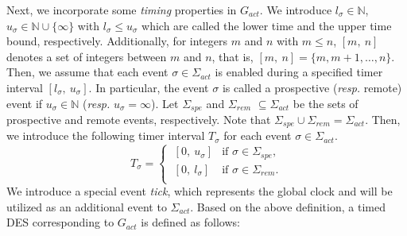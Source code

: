 \documentclass[journal,twoside,web]{IEEEtran}
\begin{document}
Next, we incorporate some \textit{timing} properties in $G_{act}$. 
We introduce $l_{\sigma} \in \mathbb{N}$, $u_{\sigma} \in  \mathbb{N} \cup \{\infty\}$ with  $l_{\sigma} \leq u_{\sigma}$ which are called the lower time and the upper time bound, respectively.
Additionally, for integers $m$ and $n$ with $m \leq n$, $[m,\ n]$ denotes a set of integers between $m$ and $n$, that is, $[m,\ n]=\{ m, m+1, \ldots , n\}$.
Then, we assume that each event $\sigma \in \Sigma_{act}$ is enabled during a specified timer interval $[ l_{\sigma},\ u_{\sigma}]$.
%
In particular, the event $\sigma$ is called a prospective ({\sl resp.} remote) event if $u_{\sigma} \in \mathbb{N}$ ({\sl resp.} $u_{\sigma} = \infty$). 
Let $\Sigma_{spe}$ and $\Sigma_{rem}$ $\subseteq \Sigma_{act}$ be the sets of prospective and remote events, respectively.  Note that $\Sigma_{spe} \cup \Sigma_{rem} = \Sigma_{act}$.
Then, we introduce the following timer interval $T_{\sigma}$ for each event $\sigma \in \Sigma_{act}$.
\begin{equation}
\label{T_sigma}
T_{\sigma}= \left\{
\begin{array}{ll}  
\ [ 0,\ u_{\sigma} ]  & \mbox{if } \sigma \in \Sigma_{spe}, \\
\ [ 0,\ l_{\sigma} ] & \mbox{if } \sigma \in \Sigma_{rem}. \\
\end{array} \right.
\end{equation}	 
%
We introduce a special event \textit{tick}, which represents the global clock and will be utilized as an additional event to $\Sigma_{act}$. 
Based on the above definition, a timed DES corresponding to $G_{act}$ is defined as follows: 
\end{document}
